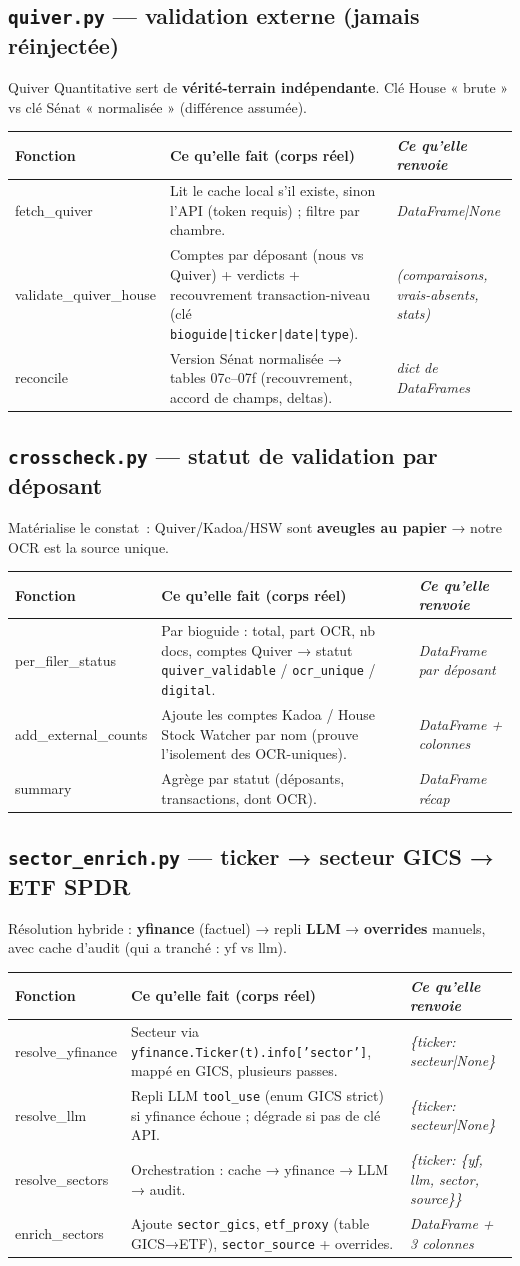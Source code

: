 \documentclass[11pt,a4paper]{article}
\newcommand{\co}[1]{\texttt{\small #1}}
\newenvironment{fntab}{%
  \par\small
  \begin{longtable}{>{\ttfamily\footnotesize}p{3.0cm} p{9.1cm} >{\itshape\footnotesize}p{3.4cm}}
  \toprule
  \normalfont\bfseries Fonction & \bfseries Ce qu'elle fait (corps réel) & \normalfont\bfseries Ce qu'elle renvoie\\
  \midrule\endhead
}{\bottomrule\end{longtable}\par}
\begin{document}
\subsection{\texttt{quiver.py} — validation externe (jamais réinjectée)}
Quiver Quantitative sert de \textbf{vérité-terrain indépendante}. Clé House « brute » vs clé Sénat
« normalisée » (différence assumée).
\begin{fntab}
fetch_quiver & Lit le cache local s'il existe, sinon l'API (token requis) ; filtre par chambre. & DataFrame|None \\
validate_quiver_house & Comptes par déposant (nous vs Quiver) + verdicts + recouvrement transaction-niveau (clé \co{bioguide|ticker|date|type}). & (comparaisons, vrais-absents, stats) \\
reconcile & Version Sénat normalisée → tables 07c–07f (recouvrement, accord de champs, deltas). & dict de DataFrames \\
\end{fntab}

\subsection{\texttt{crosscheck.py} — statut de validation par déposant}
Matérialise le constat~: Quiver/Kadoa/HSW sont \textbf{aveugles au papier} → notre OCR est la source unique.
\begin{fntab}
per_filer_status & Par bioguide : total, part OCR, nb docs, comptes Quiver → statut \co{quiver_validable} / \co{ocr_unique} / \co{digital}. & DataFrame par déposant \\
add_external_counts & Ajoute les comptes Kadoa / House Stock Watcher par nom (prouve l'isolement des OCR-uniques). & DataFrame + colonnes \\
summary & Agrège par statut (déposants, transactions, dont OCR). & DataFrame récap \\
\end{fntab}

\subsection{\texttt{sector_enrich.py} — ticker → secteur GICS → ETF SPDR}
Résolution hybride : \textbf{yfinance} (factuel) → repli \textbf{LLM} → \textbf{overrides} manuels, avec
cache d'audit (qui a tranché : yf vs llm).
\begin{fntab}
resolve_yfinance & Secteur via \co{yfinance.Ticker(t).info['sector']}, mappé en GICS, plusieurs passes. & \{ticker: secteur|None\} \\
resolve_llm & Repli LLM \co{tool_use} (enum GICS strict) si yfinance échoue ; dégrade si pas de clé API. & \{ticker: secteur|None\} \\
resolve_sectors & Orchestration : cache → yfinance → LLM → audit. & \{ticker: \{yf, llm, sector, source\}\} \\
enrich_sectors & Ajoute \co{sector_gics}, \co{etf_proxy} (table GICS→ETF), \co{sector_source} + overrides. & DataFrame + 3 colonnes \\
\end{fntab}
\end{document}
